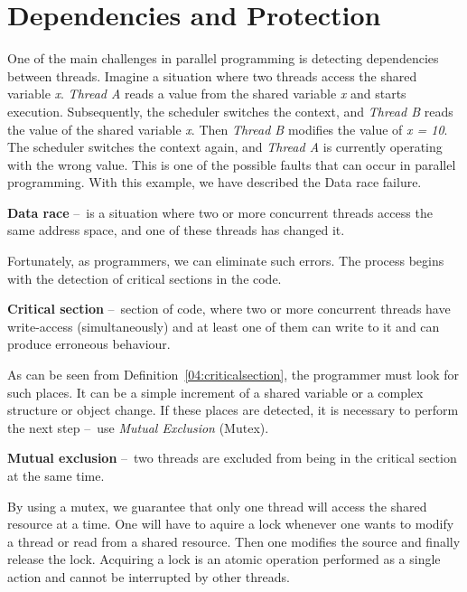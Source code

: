 \section{Dependencies and Protection}
\label{dependenciesandprotection}

One of the main challenges in parallel programming is detecting dependencies between threads.
Imagine a situation where two threads access the shared variable \emph{x}. \emph{Thread A} reads a value from the shared variable \emph{x} and starts execution.
Subsequently, the scheduler switches the context, and \emph{Thread B} reads the value of the shared variable \emph{x}. Then \emph{Thread B} modifies the value of \emph{x = 10}.
The scheduler switches the context again, and \emph{Thread A} is currently operating with the wrong value.
This is one of the possible faults that can occur in parallel programming.
With this example, we have described the Data race failure.

\begin{definition}
    \textbf{Data race} \---\ is a situation where two or more concurrent threads access the same address space, and one of these threads has changed it.
\end{definition}
Fortunately, as programmers, we can eliminate such errors.
The process begins with the detection of critical sections in the code.
\begin{definition}
    \label{04:criticalsection}
    \textbf{Critical section} \---\ section of code, where two or more concurrent threads have write-access (simultaneously) and at least one of them can write to it and can produce erroneous behaviour.
\end{definition}
As can be seen from Definition~\ref{04:criticalsection}, the programmer must look for such places.
It can be a simple increment of a shared variable or a complex structure or object change.
If these places are detected, it is necessary to perform the next step \---\ use \emph{Mutual Exclusion} (Mutex).
\begin {definition}
    \textbf{Mutual exclusion} \---\ two threads are excluded from being in the critical section at the same time.
\end {definition}
By using a mutex, we guarantee that only one thread will access the shared resource at a time.
One will have to aquire a lock whenever one wants to modify a thread or read from a shared resource.
Then one modifies the source and finally release the lock.
Acquiring a lock is an atomic operation performed as a single action and cannot be interrupted by other threads.

